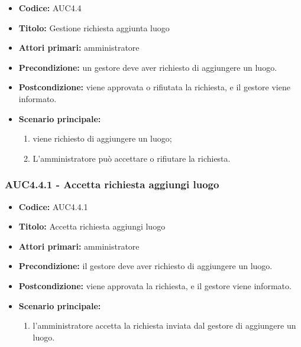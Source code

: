 \documentclass[casi-duso]{subfiles}
\begin{document}
\begin{itemize}
  \item \textbf{Codice:} AUC4.4
  \item \textbf{Titolo:} Gestione richiesta aggiunta luogo
  \item \textbf{Attori primari:} amministratore
  \item \textbf{Precondizione:} un gestore deve aver richiesto di aggiungere un luogo.
  \item \textbf{Postcondizione:} viene approvata o rifiutata la richiesta, e il gestore viene informato.
  \item \textbf{Scenario principale:}
  \begin{enumerate}
    \item viene richiesto di aggiungere un luogo;
    \item L'amministratore può accettare o rifiutare la richiesta.
  \end{enumerate}
\end{itemize}

\subsubsection{AUC4.4.1 - Accetta richiesta aggiungi luogo}%
\label{subsub:AUC4.4.1}
\begin{itemize}
  \item \textbf{Codice:} AUC4.4.1
  \item \textbf{Titolo:} Accetta richiesta aggiungi luogo
  \item \textbf{Attori primari:} amministratore
  \item \textbf{Precondizione:} il gestore deve aver richiesto di aggiungere un luogo.
  \item \textbf{Postcondizione:} viene approvata la richiesta, e il gestore viene informato.
  \item \textbf{Scenario principale:}
  \begin{enumerate}
    \item  l'amministratore accetta la richiesta inviata dal gestore di aggiungere un luogo.
  \end{enumerate}
\end{itemize}
\end{document}
